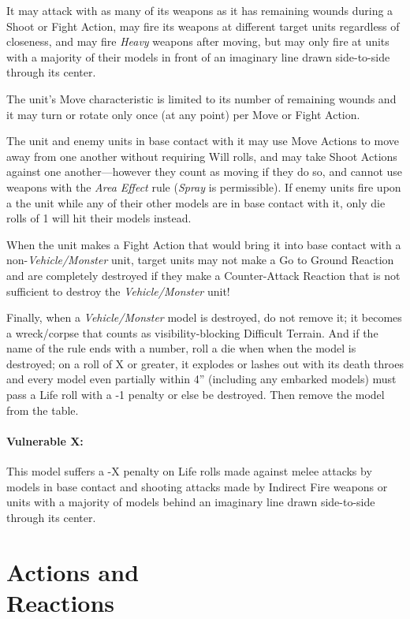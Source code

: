 \begin{multicols}{2}
It may attack with as many of its weapons as it has remaining wounds during a Shoot or Fight Action, may fire its weapons at different target units regardless of closeness, and may fire \textit{Heavy} weapons after moving, but may only fire at units with a majority of their models in front of an imaginary line drawn side-to-side through its center.

The unit's Move characteristic is limited to its number of remaining wounds and it may turn or rotate only once (at any point) per Move or Fight Action.

The unit and enemy units in base contact with it may use Move Actions to move away from one another without requiring Will rolls, and may take Shoot Actions against one another—however they count as moving if they do so, and cannot use weapons with the \textit{Area Effect} rule (\textit{Spray} is permissible). If enemy units fire upon a the unit while any of their other models are in base contact with it, only die rolls of 1 will hit their models instead.

When the unit makes a Fight Action that would bring it into base contact with a non-\textit{Vehicle/Monster} unit, target units may not make a Go to Ground Reaction and are completely destroyed if they make a Counter-Attack Reaction that is not sufficient to destroy the \textit{Vehicle/Monster} unit!

Finally, when a \textit{Vehicle/Monster} model is destroyed, do not remove it; it becomes a wreck/corpse that counts as visibility-blocking Difficult Terrain. And if the name of the rule ends with a number, roll a die when when the model is destroyed; on a roll of X or greater, it explodes or lashes out with its death throes and every model even partially within 4'' (including any embarked models) must pass a Life roll with a -1 penalty or else be destroyed. Then remove the model from the table.

\subsubsection*{Vulnerable X:} This model suffers a -X penalty on Life rolls made against melee attacks by models in base contact and shooting attacks made by Indirect Fire weapons or units with a majority of models behind an imaginary line drawn side-to-side through its center.




\chapter*{Actions and\\ Reactions}


\end{multicols}
